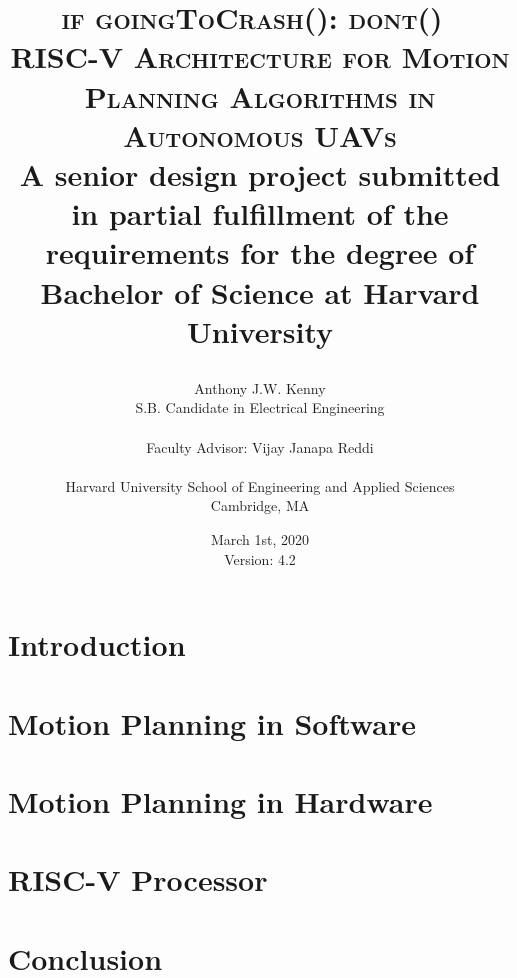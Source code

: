 \documentclass[
    11pt,           %
    letterpaper,    %
    oneside         %
]{report}           %
\title{\textsc{if goingToCrash(): dont()\ \\ RISC-V Architecture for Motion Planning Algorithms in Autonomous UAVs} \\ 
    \bigskip
    \small{A senior design project submitted in partial fulfillment of the requirements for the degree of Bachelor of Science at Harvard University} \\
\author{Anthony J.W. Kenny \\
        \small{S.B. Candidate in Electrical Engineering} \\ \\
        Faculty Advisor: Vijay Janapa Reddi \\ \\
        Harvard University School of Engineering and Applied Sciences \\
        \small{Cambridge, MA}}
\date{March 1st, 2020 \\ 
    \small{Version: 4.2}}}
\begin{document}
\maketitle


    
    \clearpage

    \tableofcontents
    \clearpage

    \printglossary[type=\acronymtype,title={List of Acronyms},nopostdot]

    \listofalgorithms

    \listoffigures

    \listoftables


\chapter{Introduction}
    


\chapter{Motion Planning in Software}
    \label{chap:MotionPlanningInSoftware}
    

\chapter{Motion Planning in Hardware}
    \label{chap:MotionPlanningInHardware}
    

\chapter{RISC-V Processor}
    \label{chap:RiscvProcessor}
    

\chapter{Conclusion}
\end{document}
